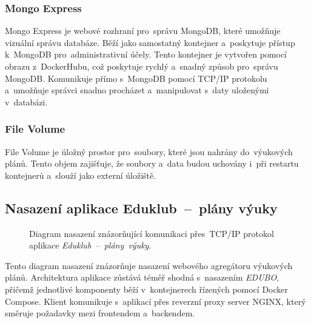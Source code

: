\documentclass[male,czech,api_bc]{kitheses}
\begin{document}
\subsubsection{Mongo Express}
Mongo Express je webové rozhraní pro~správu MongoDB, které umožňuje vizuální správu databáze. Běží jako samostatný kontejner a~poskytuje přístup k~MongoDB pro~administrativní účely. Tento kontejner je vytvořen pomocí obrazu z~DockerHubu, což poskytuje rychlý a~snadný způsob pro~správu MongoDB. Komunikuje přímo s~MongoDB pomocí TCP/IP protokolu a~umožňuje správci snadno procházet a~manipulovat s~daty uloženými v~databázi.

\subsubsection{File Volume}
File Volume je úložný prostor pro~soubory, které jsou nahrány do~výukových plánů. Tento objem zajišťuje, že soubory a~data budou uchovány i~při restartu kontejnerů a~slouží jako externí úložiště.

\subsection{Nasazení aplikace Eduklub~--~plány výuky}

\begin{figure}[H]
	\centering
	\caption{Diagram nasazení znázorňující komunikaci přes~TCP/IP protokol aplikace \mbox{\textit{Eduklub~--~plány výuky}.}}
	\label{fig:deployment-diagram-2}
\end{figure}


Tento diagram nasazení znázorňuje nasazení webového agregátoru výukových plánů. Architektura aplikace zůstává téměř shodná s~nasazením \textit{EDUBO}, přičemž jednotlivé komponenty běží v~kontejnerech řízených pomocí Docker Compose. Klient komunikuje s~aplikací přes reverzní proxy server NGINX, který směruje požadavky mezi frontendem a~backendem.
\end{document}

